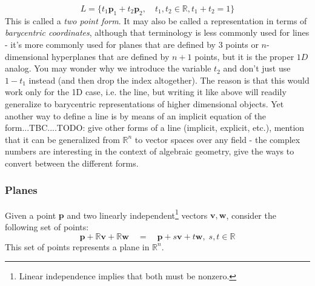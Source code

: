 \begin{equation}
 L = \{ t_1 \mathbf{p}_1 + t_2 \mathbf{p}_2,  \quad t_1, t_2 \in \mathbb{R}, t_1 + t_2 = 1 \}
\end{equation}
This is called a \emph{two point form}. It may also be called a representation in terms of \emph{barycentric coordinates}, although that terminology is less commonly used for lines - it's more commonly used for planes that are defined by 3 points or $n$-dimensional hyperplanes that are defined by $n+1$ points, but it is the proper $1D$ analog. You may wonder why we introduce the variable $t_2$ and don't just use $1 - t_1$ instead (and then drop the index altogether). The reason is that this would work only for the 1D case, i.e. the line, but writing it like above will readily generalize to barycentric representations of higher dimensional objects. Yet another way to define a line is by means of an implicit equation of the form...TBC....TODO: give other forms of a line (implicit, explicit, etc.), mention that it can be generalized from $\mathbb{R}^n$ to vector spaces over any field - the complex numbers are interesting in the context of algebraic geometry, give the ways to convert between the different forms.




\subsubsection{Planes}
Given a point $\mathbf{p}$ and two linearly independent\footnote{Linear independence implies that both must be nonzero.} vectors $\mathbf{v, w}$, consider the following set of points:
\begin{equation}
 \mathbf{p} + \mathbb{R} \mathbf{v}  + \mathbb{R} \mathbf{w}
 \quad = \quad
 \mathbf{p} + s \mathbf{v} + t \mathbf{w}, \; s,t \in \mathbb{R}
\end{equation}
This set of points represents a plane in $\mathbb{R}^n$. 

